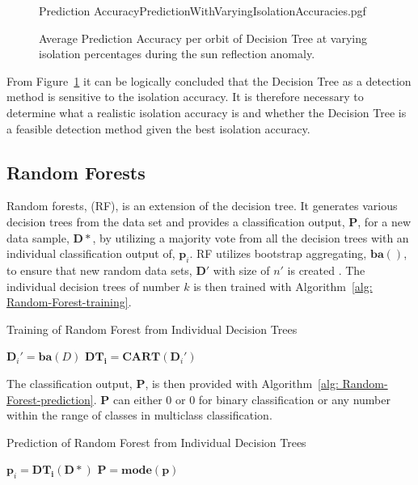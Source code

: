 \begin{figure}[!htb]
	\centering
	{Prediction AccuracyPredictionWithVaryingIsolationAccuracies.pgf}
	
	\caption{Average Prediction Accuracy per orbit of Decision Tree at varying isolation percentages  during the sun reflection anomaly.}
	\label{fig:DecisionTreesWithVaryingIsolationPrediction}
\end{figure}

From Figure~\ref{fig:DecisionTreesWithVaryingIsolationPrediction} it can be logically concluded that the Decision Tree as a detection method is sensitive to the isolation accuracy. It is therefore necessary to determine what a realistic isolation accuracy is and whether the Decision Tree is a feasible detection method given the best isolation accuracy.

\subsection{Random Forests}
Random forests, (RF), is an extension of the decision tree. It generates various decision trees from the data set and provides a classification output, $\mathbf{P}$, for a new data sample, $\mathbf{D}*$, by utilizing a majority vote from all the decision trees with an individual classification output of, $\mathbf{p}_i$. RF utilizes bootstrap aggregating, $\mathbf{ba}()$, to ensure that new random data sets, $\mathbf{D}'$ with size of $n'$ is created \cite{Primartha2018, Paul2018, Shi2006}. The individual decision trees of number $k$ is then trained with Algorithm~\ref{alg: Random-Forest-training}.

\begin{algorithm}[!htb]
	\caption[Random Forest]{Training of Random Forest from Individual Decision Trees}
	\label{alg: Random-Forest-training}
	\begin{algorithmic}[1]
		\State \texttt{$\mathbf{D}_i' = \mathbf{ba}(D)$}
		\State \texttt{$\mathbf{DT_i} = \mathbf{CART}(\mathbf{D}_i')$}
		\EndFor
	\end{algorithmic}
\end{algorithm}
The classification output, $\mathbf{P}$, is then provided with Algorithm~\ref{alg: Random-Forest-prediction}. $\mathbf{P}$ can either $0$ or $0$ for binary classification or any number within the range of classes in multiclass classification.
\begin{algorithm}[!htb]
	\caption[Random Forest]{Prediction of Random Forest from Individual Decision Trees}
	\label{alg: Random-Forest-prediction}
	\begin{algorithmic}[1]
	\State \texttt{$\mathbf{p}_i = \mathbf{DT_i}(\mathbf{D}*)$}
	\EndFor
	\State $\mathbf{P} = \textbf{mode}(\mathbf{p})$
	\end{algorithmic}
\end{algorithm}

